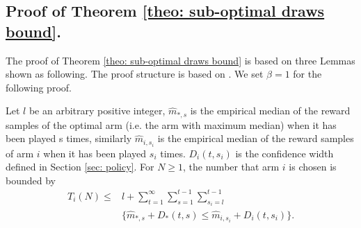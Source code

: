 \subsection{Proof of Theorem \ref{theo: sub-optimal draws bound}.}
\label{app-subsec: proof of theo: sub-optimal draws bound}


The proof of Theorem \ref{theo: sub-optimal draws bound} is based on three Lemmas shown as following. The proof structure is based on \cite{Auer2002}. We set $\beta = 1$ for the following proof.
\begin{lemma}
\label{lemma: appendix sub-optimal bound proof 1}
Let $l$ be an arbitrary positive integer, $\hat{m}_{*, s}$ is the empirical median of the reward samples of the optimal arm (i.e. the arm with maximum median) when it has been played s times, similarly $\hat{m}_{i, s_i}$ is the empirical median of the reward samples of arm $i$ when it has been played $s_i$ times. $D_i(t, s_i)$ is the confidence width defined in Section \ref{sec: policy}. For $N \geq 1$, the number that arm $i$ is chosen is bounded by
\begin{align}
    T_i\left(N\right) \leq & l + \sum_{t = 1}^\infty \sum_{s = 1}^{t-1} \sum_{s_i = l}^{t-1} \nonumber \\
    & \{\hat{m}_{*, s} + D_*(t, s)  \leq \hat{m}_{i, s_i} + D_i(t, s_i)\}.
\end{align}
\end{lemma}

